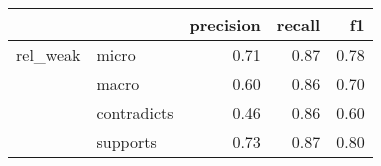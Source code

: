 \begin{tabular}{llrrr}
\toprule
         &          &  precision &  recall &   f1 \\
\midrule
rel\_weak & micro &       0.71 &    0.87 & 0.78 \\
         & macro &       0.60 &    0.86 & 0.70 \\
         & contradicts &       0.46 &    0.86 & 0.60 \\
         & supports &       0.73 &    0.87 & 0.80 \\
\bottomrule
\end{tabular}
